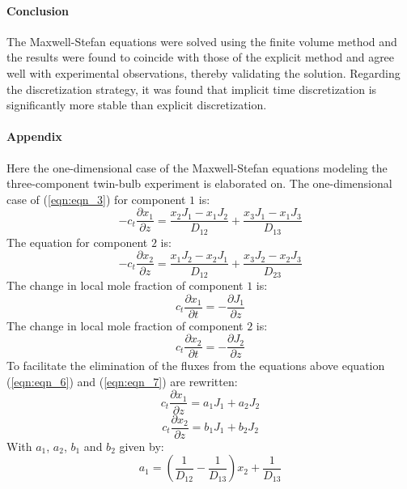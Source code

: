 \documentclass[twocolumn]{article}
\begin{document}
\paragraph*{Conclusion}
The Maxwell-Stefan equations were solved using the finite volume method and the results were found to coincide with those of the explicit method and agree well with experimental observations, thereby validating the solution. Regarding the discretization strategy, it was found that implicit time discretization is significantly more stable than explicit discretization. 

\paragraph*{Appendix}
Here the one-dimensional case of the Maxwell-Stefan equations modeling the three-component twin-bulb experiment is elaborated on. The one-dimensional case of (\ref{eqn:eqn_3}) for component $1$ is:
\begin{equation}
\label{eqn:eqn_6}
-c_t \frac{\partial x_1}{\partial z} = \frac{x_2 J_1 - x_1 J_2}{D_{12}} + \frac{x_3 J_1 - x_1 J_3}{D_{13}}
\end{equation}
The equation for component $2$ is:
\begin{equation}
\label{eqn:eqn_7}
-c_t \frac{\partial x_2}{\partial z} = \frac{x_1 J_2 - x_2 J_1}{D_{12}} + \frac{x_3 J_2 - x_2 J_3}{D_{23}}
\end{equation}
The change in local mole fraction of component $1$ is:
\begin{equation}
\label{eqn:eqn_8}
c_t \frac{\partial x_1}{\partial t} = - \frac{\partial J_1}{\partial z}
\end{equation}
The change in local mole fraction of component $2$ is:
\begin{equation}
\label{eqn:eqn_9}
c_t \frac{\partial x_2}{\partial t} = - \frac{\partial J_2}{\partial z}
\end{equation}
To facilitate the elimination of the fluxes from the equations above equation (\ref{eqn:eqn_6}) and (\ref{eqn:eqn_7}) are rewritten:
\begin{equation}
\label{eqn:eqn_10}
c_t \frac{\partial x_1}{\partial z} = a_1 J_1 + a_2 J_2
\end{equation}
\begin{equation}
\label{eqn:eqn_11}
c_t \frac{\partial x_2}{\partial z} = b_1 J_1 + b_2 J_2
\end{equation}
With $a_1$, $a_2$, $b_1$ and $b_2$ given by:
\begin{equation}
\label{eqn:eqn_12}
a_1 = \left( \frac{1}{D_{12}} - \frac{1}{D_{13}} \right) x_2 + \frac{1}{D_{13}}
\end{equation}
\end{document}
